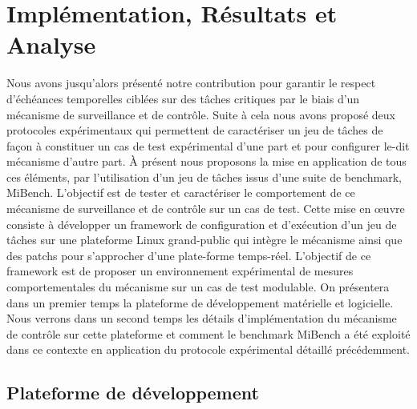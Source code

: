 \documentclass[french, a4paper, 11pt, twoside, pdftex]{StyleThese}
\begin{document}
\setcounter{chapter}{5} %
\dominitoc
\faketableofcontents
\fi

	\setlength{\belowcaptionskip}{-6pt}
	
\chapter{Implémentation, Résultats et Analyse} \label{chap:5_ImplementationCase}
\minitoc

Nous avons jusqu'alors présenté notre contribution pour garantir le respect d'échéances temporelles ciblées sur des tâches critiques par le biais d'un mécanisme de surveillance et de contrôle. Suite à cela nous avons proposé deux protocoles expérimentaux qui permettent de caractériser un jeu de tâches de façon à constituer un cas de test expérimental d'une part et pour configurer le-dit mécanisme d'autre part. À présent nous proposons la mise en application de tous ces éléments, par l'utilisation d'un jeu de tâches issus d'une suite de benchmark, MiBench. L'objectif est de tester et caractériser le comportement de ce mécanisme de surveillance et de contrôle sur un cas de test. Cette mise en œuvre consiste à développer un framework de configuration et d'exécution d'un jeu de tâches sur une plateforme Linux grand-public qui intègre le mécanisme ainsi que des patchs pour s'approcher d'une plate-forme temps-réel. L'objectif de ce framework est de proposer un environnement expérimental de mesures comportementales du mécanisme sur un cas de test modulable. On présentera dans un premier temps la plateforme de développement matérielle et logicielle. Nous verrons dans un second temps les détails d'implémentation du mécanisme de contrôle sur cette plateforme et comment le benchmark MiBench a été exploité dans ce contexte en application du protocole expérimental détaillé précédemment.


\section{Plateforme de développement}
    
\end{document}
